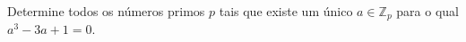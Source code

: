 Determine todos os números primos \(p\) tais que existe um único \(a \in \mathbb{Z}_p\) para o qual \(a^3 - 3a + 1 = 0.\)
